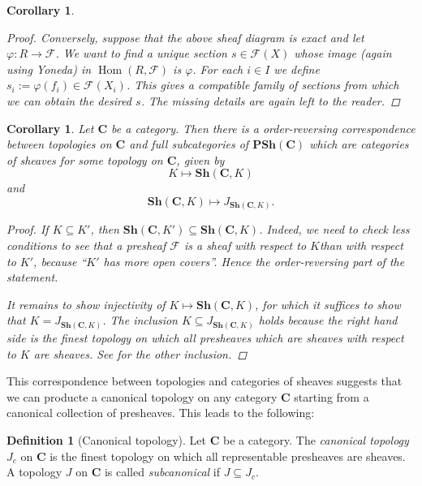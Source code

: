 \documentclass[12pt,reqno,a4paper]{amsart}
\theoremstyle{plain}
\newtheorem{cor}[thm]{Corollary}
\theoremstyle{definition}
\newtheorem{defn}[thm]{Definition}
\theoremstyle{remark}
\begin{document}
\begin{cor}
\begin{proof}
    Conversely, suppose that the above sheaf diagram is exact and let $\varphi \colon R \to \mathscr{F}$.
    We want to find a unique section $s \in \mathscr{F}(X)$ whose image (again using Yoneda) in $\operatorname{Hom}(R,\mathscr{F})$ is $\varphi$.
    For each $i \in I$ we define $s_{i} := \varphi(f_{i}) \in \mathscr{F}(X_{i})$.
    This gives a compatible family of sections from which we can obtain the desired $s$.
    The missing details are again left to the reader.

  \end{proof}
\end{cor}

\begin{cor}\label{cor:correspondence}
  Let $\mathbf{C}$ be a category.
  Then there is a order-reversing correspondence between topologies on $\mathbf{C}$ and full subcategories of $\mathbf{PSh}(\mathbf{C})$ which are categories of sheaves for some topology on $\mathbf{C}$, given by
  \[ K \mapsto \mathbf{Sh}(\mathbf{C},K) \]
  and
  \[ \mathbf{Sh}(\mathbf{C},K) \mapsto J_{\mathbf{Sh}(\mathbf{C},K)}. \]
  \begin{proof}
    If $K \subseteq K'$, then $\mathbf{Sh}(\mathbf{C},K') \subseteq \mathbf{Sh}(\mathbf{C},K)$.
    Indeed, we need to check less conditions to see that a presheaf $\mathscr{F}$ is a sheaf with respect to $K$than with respect to $K'$, because ``$K'$ has more open covers''.
    Hence the order-reversing part of the statement.

    It remains to show injectivity of $K \mapsto \mathbf{Sh}(\mathbf{C},K)$, for which it suffices to show that $K = J_{\mathbf{Sh}(\mathbf{C},K)}$.
    The inclusion $K \subseteq J_{\mathbf{Sh}(\mathbf{C},K)}$ holds because the right hand side is the finest topology on which all presheaves which are sheaves with respect to $K$ are sheaves.
    See \cite[\href{https://stacks.math.columbia.edu/tag/00ZP}{Tag 00ZP}]{stacks-project} for the other inclusion.
  \end{proof}
\end{cor}

This correspondence between topologies and categories of sheaves suggests that we can producte a canonical topology on any category $\mathbf{C}$ starting from a canonical collection of presheaves.
This leads to the following:

\begin{defn}[Canonical topology]
  Let $\mathbf{C}$ be a category.
  The \textit{canonical topology} $J_{c}$ on $\mathbf{C}$ is the finest topology on which all representable presheaves are sheaves.
  A topology $J$ on $\mathbf{C}$ is called \textit{subcanonical} if $J \subseteq J_{c}$.
\end{defn}
\end{document}
